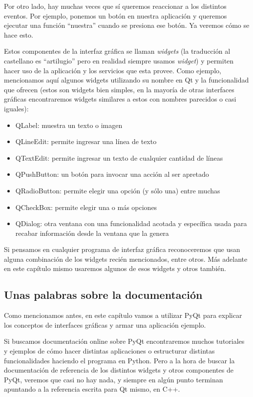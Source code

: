 Por otro lado, hay muchas veces que sí queremos reaccionar a los distintos eventos. Por ejemplo, ponemos un botón en nuestra aplicación y queremos ejecutar una función ``nuestra'' cuando se presiona ese botón. Ya veremos cómo se hace esto.

Estos componentes de la interfaz gráfica se llaman \textit{widgets} (la traducción al castellano es ``artilugio'' pero en realidad siempre usamos \textit{widget}) y permiten hacer uso de la aplicación y los servicios que esta provee. Como ejemplo, mencionamos aquí algunos widgets utilizando su nombre en Qt y la funcionalidad que ofrecen (estos son widgets bien simples, en la mayoría de otras interfaces gráficas encontraremos widgets similares a estos con nombres parecidos o casi iguales):

\begin{itemize}
\item QLabel: muestra un texto o imagen
\item QLineEdit: permite ingresar una línea de texto
\item QTextEdit: permite ingresar un texto de cualquier cantidad de líneas
\item QPushButton: un botón para invocar una acción al ser apretado
\item QRadioButton: permite elegir una opción (y sólo una) entre muchas
\item QCheckBox: permite elegir una o más opciones
\item QDialog: otra ventana con una funcionalidad acotada y específica usada para recabar información desde la ventana que la genera
\end{itemize}

Si pensamos en cualquier programa de interfaz gráfica reconoceremos que usan alguna combinación de los widgets recién mencionados, entre otros. Más adelante en este capítulo mismo usaremos algunos de esos widgets y otros también.


\subsection{Unas palabras sobre la documentación}

Como mencionamos antes, en este capítulo vamos a utilizar PyQt para explicar los conceptos de interfaces gráficas y armar una aplicación ejemplo.

Si buscamos documentación online sobre PyQt encontraremos muchos tutoriales y ejemplos de cómo hacer distintas aplicaciones o estructurar distintas funcionalidades haciendo el programa en Python. Pero a la hora de buscar la documentación de referencia de los distintos widgets y otros componentes de PyQt, veremos que casi no hay nada, y siempre en algún punto terminan apuntando a la referencia escrita para Qt mismo, en C++.

